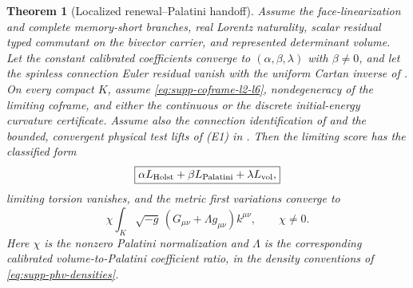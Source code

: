 \documentclass[11pt]{article}
\newtheorem{theorem}{Theorem}[section]
\theoremstyle{definition}
\theoremstyle{remark}
\begin{document}
\begin{theorem}[Localized renewal--Palatini handoff]
\label{thm:supp-renewal-palatini}
Assume the face-linearization and complete memory-short branches, real Lorentz
naturality, scalar residual typed commutant on the bivector carrier, and
represented determinant volume.  Let the constant calibrated coefficients
converge to $(\alpha,\beta,\lambda)$ with $\beta\ne0$, and let the spinless
connection Euler residual vanish with the uniform Cartan inverse of
.  On every compact $K$, assume
\eqref{eq:supp-coframe-l2-l6}, nondegeneracy of the limiting coframe, and either
the continuous or the discrete initial-energy curvature certificate.
Assume also the connection identification of
 and the bounded, convergent physical test
lifts of \textup{(E1)} in .
Then the limiting score has the classified form
\begin{equation}
 \boxed{\alpha L_{\rm Holst}+\beta L_{\rm Palatini}+\lambda L_{\rm vol},}
 \label{eq:supp-phv-classification}
\end{equation}
limiting torsion vanishes, and the metric first variations converge to
\begin{equation}
 \boxed{\chi\int_K\sqrt{-g}\,
       (G_{\mu\nu}+\Lambda g_{\mu\nu})k^{\mu\nu},\qquad\chi\ne0.}
 \label{eq:supp-einstein-insertion}
\end{equation}
Here $\chi$ is the nonzero Palatini normalization and $\Lambda$ is the
corresponding calibrated volume-to-Palatini coefficient ratio, in the density
conventions of \eqref{eq:supp-phv-densities}.
\end{theorem}
\end{document}
